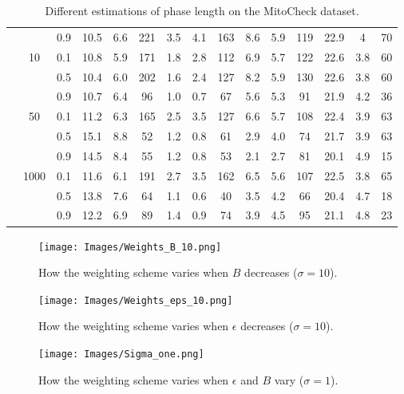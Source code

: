 \documentclass{article}
\begin{document}
\begin{table}[!ht]
\begin{tabular}{|c|c|c|c|c|c|c|c|c|c|c|c|c|c|c|}
                &   & 0.9 & 10.5 & 6.6 & 221 & 3.5 & 4.1 & 163 & 8.6 & 5.9 & 119 &22.9 &4 &70\\
                & 10 & 0.1 & 10.8 & 5.9 & 171 & 1.8 & 2.8 & 112 & 6.9 & 5.7 & 122 & 22.6& 3.8&60\\
                &   & 0.5 & 10.4 & 6.0 & 202 & 1.6 & 2.4 & 127 & 8.2 & 5.9 & 130 & 22.6&3.8 &60\\
                &   & 0.9 & 10.7 & 6.4 & 96 & 1.0 & 0.7 & 67 & 5.6 & 5.3 & 91 & 21.9&4.2 &36\\
                & 50 & 0.1 & 11.2 & 6.3 & 165 & 2.5 & 3.5 & 127 & 6.6 & 5.7 & 108 &22.4 &3.9 &63\\
                &   & 0.5 & 15.1 & 8.8 & 52 & 1.2 & 0.8 & 61 & 2.9 & 4.0 & 74 &21.7 & 3.9&63\\
                &   & 0.9 & 14.5 & 8.4 & 55 & 1.2 & 0.8 & 53 & 2.1 & 2.7 & 81 &20.1 &4.9 &15\\
                & 1000 & 0.1 & 11.6 & 6.1 & 191 & 2.7 & 3.5 & 162 & 6.5 & 5.6 & 107 &22.5 &3.8 &65\\
                &   & 0.5 & 13.8 & 7.6 & 64 & 1.1 & 0.6 & 40 & 3.5 & 4.2 & 66 &20.4 &4.7 &18\\
                &   & 0.9 & 12.2 & 6.9 & 89 & 1.4 & 0.9 & 74 & 3.9 & 4.5 & 95 &21.1 &4.8 &23\\
  \hline
\end{tabular}
\caption{Different estimations of phase length on the MitoCheck dataset.}
\label{tab: resMito}
\end{table}


\begin{figure}
\centering
\texttt{[image: Images/Weights\_B\_10.png]}
\caption{How the weighting scheme varies when $B$ decreases ($\sigma=10$).}
\label{fig: B_decrease}
\end{figure}

\begin{figure}
\centering
\texttt{[image: Images/Weights\_eps\_10.png]}
\caption{How the weighting scheme varies when $\epsilon$ decreases ($\sigma=10$).}
\label{fig: eps_decrease}
\end{figure}

\begin{figure}
\centering
\texttt{[image: Images/Sigma\_one.png]}
\caption{How the weighting scheme varies when $\epsilon$ and $B$ vary ($\sigma=1$).}
\label{fig: Sigma_one}
\end{figure}
\end{document}
